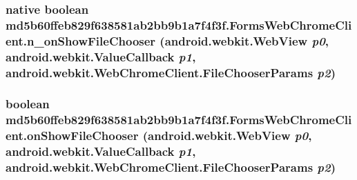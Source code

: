\hypertarget{classmd5b60ffeb829f638581ab2bb9b1a7f4f3f_1_1_forms_web_chrome_client_d8f4fdd59e647809da2cedab336eac27}{
\subsubsection[{n\_\-onShowFileChooser}]{\setlength{\rightskip}{0pt plus 5cm}native boolean md5b60ffeb829f638581ab2bb9b1a7f4f3f.FormsWebChromeClient.n\_\-onShowFileChooser (android.webkit.WebView {\em p0}, \/  android.webkit.ValueCallback {\em p1}, \/  android.webkit.WebChromeClient.FileChooserParams {\em p2})}}
\label{classmd5b60ffeb829f638581ab2bb9b1a7f4f3f_1_1_forms_web_chrome_client_d8f4fdd59e647809da2cedab336eac27}


\hypertarget{classmd5b60ffeb829f638581ab2bb9b1a7f4f3f_1_1_forms_web_chrome_client_870ec31fb8f8d9e959487609161690fc}{
\subsubsection[{onShowFileChooser}]{\setlength{\rightskip}{0pt plus 5cm}boolean md5b60ffeb829f638581ab2bb9b1a7f4f3f.FormsWebChromeClient.onShowFileChooser (android.webkit.WebView {\em p0}, \/  android.webkit.ValueCallback {\em p1}, \/  android.webkit.WebChromeClient.FileChooserParams {\em p2})}}
\label{classmd5b60ffeb829f638581ab2bb9b1a7f4f3f_1_1_forms_web_chrome_client_870ec31fb8f8d9e959487609161690fc}




